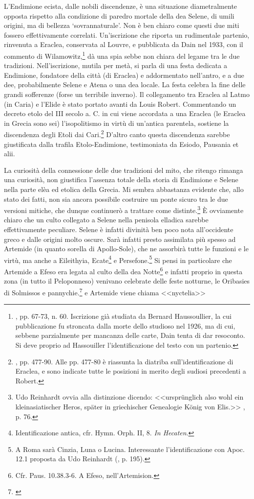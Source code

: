 \documentclass[12pt,a4paper,openright, oneside]{book}
\begin{document}
L'Endimione ecista, dalle nobili discendenze, è una situazione diametralmente opposta rispetto alla condizione di paredro mortale della dea Selene, di umili origini, ma di bellezza `sovrannaturale'. Non è ben chiaro come questi due miti fossero effettivamente correlati. Un'iscrizione che riporta un rudimentale partenio, rinvenuta a Eraclea, conservata al Louvre, e pubblicata da Dain nel 1933, con il commento di Wilamowitz,\footnote{\cite{Dain}, pp. 67-73, n. 60. Iscrizione già studiata da Bernard  Haussoullier, la cui pubblicazione fu stroncata dalla morte dello studioso nel 1926, ma di cui, sebbene parzialmente per mancanza delle carte, Dain tenta di dar resoconto. Si deve proprio ad Hassouiller l'identificazione del testo con un partenio.} dà una spia sebbe non chiara del legame tra le due tradizioni. Nell'iscrizione, mutila per metà, si parla di una festa dedicata a Endimione, fondatore della città (di Eraclea) e addormentato nell'antro, e a due dee, probabilmente Selene e Atena o una dea locale. La festa celebra la fine delle grandi sofferenze (forse un terribile inverno). Il collegamento tra Eraclea al Latmo (in Caria) e l'Elide è stato portato avanti da Louis Robert. Commentando un decreto etolo del III secolo a. C. in cui viene accordata a una Eraclea (le Eraclea in Grecia sono sei) l'isopolitismo in virtù di un'antica parentela, sostiene la discendenza degli Etoli dai Cari.\footnote{\cite{Robert}, pp. 477-90. Alle pp. 477-80 è riassunta la diatriba sull'identificazione di Eraclea, e sono indicate tutte le posizioni in merito degli sudiosi precedenti a Robert.} D'altro canto questa discendenza sarebbe giustificata dalla trafila Etolo-Endimione, testimoniata da Esiodo, Pausania et alii.

La curiosità della connessione delle due tradizioni del mito, che ritengo rimanga una curiosità, non giustifica l'assenza totale della storia di Endimione e  Selene nella parte elèa ed etolica della Grecia. Mi sembra abbastanza evidente che, allo stato dei fatti, non sia ancora possibile costruire un ponte sicuro tra le due versioni mitiche, che dunque continuerò a trattare come distinte.\footnote{Udo Reinhardt ovvia alla distinzione dicendo: <<urspr\"unglich also wohl ein kleinasiatischer Heros, sp\"ater in griechischer Genealogie K\"onig von Elis.>> \cite{Reinhardt}, p. 76.}  È ovviamente chiaro che un culto collegato a Selene nella penisola elladica sarebbe effettivamente peculiare.  Selene è infatti divinità ben poco nota all'occidente greco e dalle origini molto oscure. Sarà infatti presto assimilata più spesso ad Artemide (in quanto sorella di Apollo-Sole),  che ne assorbirà tutte le funzioni e le virtù, ma anche a Eileithyia, Ecate\footnote{Identificazione antica, cfr. Hymn. Orph. II, 8. \textit{In Hecaten}.} e Persefone.\footnote{A Roma sarà Cinzia, Luna o Lucina. Interessante l'identificazione con Apoc. 12.1 proposta da Udo Reinhardt (\cite{Reinhardt}, p. 195). } Si pensi in particolare che Artemide a Efeso era legata al culto della dea Notte\footnote{Cfr. Paus. 10.38.3-6. A Efeso, nell'Artemision.} e infatti proprio in questa zona (in tutto il Peloponneso) venivano celebrate delle feste notturne, le Oribasies di Solmissos e pannychie.\footnote{\cite{Ramnoux}} e Artemide viene chiama <<nyctelia>>
\end{document}
